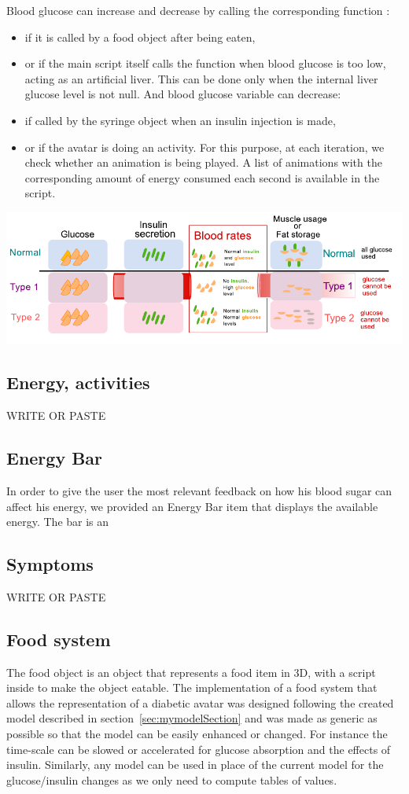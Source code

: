 Blood glucose can increase and decrease by calling the corresponding function : 
\begin{itemize}
\item if it is called by a food object after being eaten, 
\item or if the main script itself calls the function when blood glucose is too low, acting as an artificial liver. This can be done only when the internal liver glucose level is not null. 
And blood glucose variable can decrease:
\item if called by the syringe object when an insulin injection is made, 
\item or if the avatar is doing an activity. For this purpose, at each iteration, we check whether an animation is being played. A list of animations with the corresponding amount of energy consumed each second is available in the script. 
\end{itemize}

\includegraphics{diabetes_drawing}


\subsection{Energy, activities}
WRITE OR PASTE
\subsection{Energy Bar}
In order to give the user the most relevant feedback on how his blood sugar can affect his energy, we provided an Energy Bar item that displays the available energy. The bar is an 
\subsection{Symptoms}
WRITE OR PASTE
\subsection{Food system}

The food object is an object that represents a food item in 3D, with a script inside to make the object eatable. The implementation of a food system that allows the representation of a diabetic avatar was designed following the created model described in section~\ref{sec:mymodelSection} and was made as generic as possible so that the model can be easily enhanced or changed. For instance the time-scale can be slowed or accelerated for glucose absorption and the effects of insulin. Similarly, any model can be used in place of the current model for the glucose/insulin changes as we only need to compute tables of values.

